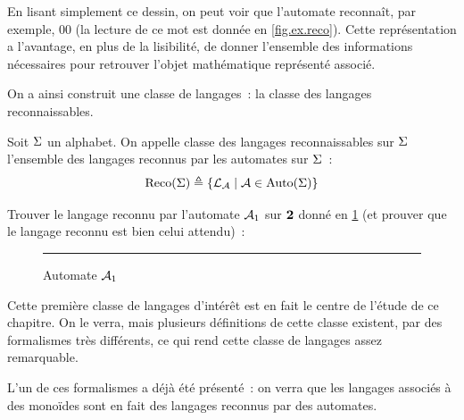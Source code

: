 En lisant simplement ce dessin, on peut voir que l'automate reconnaît, par
exemple, $00$ (la lecture de ce mot est donnée en \cref{fig.ex.reco}). Cette
représentation a l'avantage, en plus de la lisibilité, de donner l'ensemble des
informations nécessaires pour retrouver l'objet mathématique représenté associé.

On a ainsi construit une classe de langages~: la classe des langages
reconnaissables.

\begin{definition}
  Soit $\Sigma$ un alphabet. On appelle classe des langages reconnaissables sur
  $\Sigma$ l'ensemble des langages reconnus par les automates sur $\Sigma$~:
  \[\operatorname{Reco}(\Sigma) \triangleq \left\{ \mathcal L_{\mathcal{A}} \;\middle\vert\; \mathcal{A}\in\operatorname{Auto}(\Sigma) \right\}\]
  \index[notation]{$\Reco(\ABA)$}
\end{definition}

\begin{exercise}
  Trouver le langage reconnu par l'automate $\mathcal{A}_1$ sur $\bm{2}$
  donné en \cref{fig.auto.exo1} (et prouver que le langage reconnu est bien
  celui attendu)~:
  \begin{figure}[t]
    \centering
  
  \vspace{0.2cm}
  \hrule

  \vspace{0.2cm}
  \caption{Automate $\mathcal{A}_1$}
  \label{fig.auto.exo1}
  \end{figure}
\end{exercise}

Cette première classe de langages d'intérêt est en fait le centre de l'étude de
ce chapitre. On le verra, mais plusieurs définitions de cette classe existent,
par des formalismes très différents, ce qui rend cette classe de langages assez
remarquable.

L'un de ces formalismes a déjà été présenté~: on verra que les langages associés
à des monoïdes sont en fait des langages reconnus par des automates.

